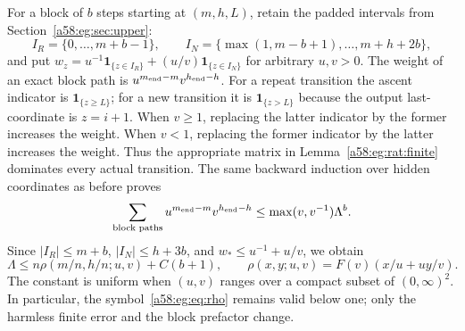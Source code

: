 \documentclass[11pt,letterpaper]{article}
\theoremstyle{remark}
\newcommand{\ind}[1]{\mathbf1_{\{#1\}}}
\begin{document}
For a block of $b$ steps starting at $(m,h,L)$, retain the padded intervals from Section~\ref{a58:eg:sec:upper}:
\[
 I_R=\{0,\ldots,m+b-1\},\qquad
 I_N=\{\max(1,m-b+1),\ldots,m+h+2b\},
\]
and put $w_z=u^{-1}\ind{z\in I_R}+(u/v)\ind{z\in I_N}$ for arbitrary $u,v>0$. The weight of an exact block path is
$u^{m_{\rm end}-m}v^{h_{\rm end}-h}$.
For a repeat transition the ascent indicator is $\ind{z\ge L}$; for a new transition it is $\ind{z>L}$ because the output last-coordinate is $z=i+1$.
When $v\ge1$, replacing the latter indicator by the former increases the weight. When $v<1$, replacing the former indicator by the latter increases the weight. Thus the appropriate matrix in Lemma~\ref{a58:eg:rat:finite} dominates every actual transition. The same backward induction over hidden coordinates as before proves
\begin{equation}\label{a58:eg:rat:block}
 \sum_{\text{block paths}}u^{m_{\rm end}-m}v^{h_{\rm end}-h}
 \le\max(v,v^{-1})\Lambda^b.
\end{equation}
Since $|I_R|\le m+b$, $|I_N|\le h+3b$, and $w_*\le u^{-1}+u/v$, we obtain
\begin{equation}\label{a58:eg:rat:lambdabound}
 \Lambda\le n\rho(m/n,h/n;u,v)+C(b+1),\qquad
 \rho(x,y;u,v)=F(v)(x/u+uy/v).
\end{equation}
The constant is uniform when $(u,v)$ ranges over a compact subset of $(0,\infty)^2$. In particular, the symbol~\eqref{a58:eg:eq:rho} remains valid below one; only the harmless finite error and the block prefactor change.
\end{document}
